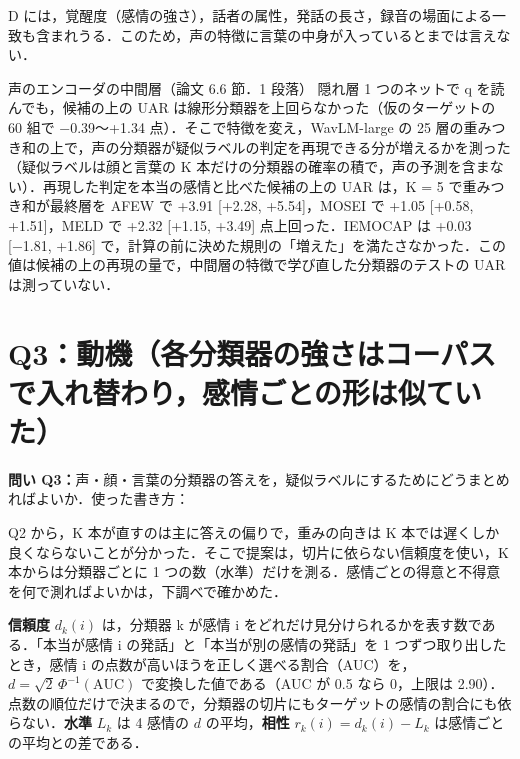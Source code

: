 \documentclass[a4paper,10pt]{ltjsarticle}
\newcommand{\toihead}[4][]{\begin{headbar}[#2]\textbf{\textcolor{#2}{問い #3：}}#4\if\relax\detokenize{#1}\relax\else\hfill{\small 使った書き方：}#1\fi\end{headbar}}
\newcommand{\pagesection}[1]{\clearpage\section{#1}}
\begin{document}
\begin{yowai}
D には，覚醒度（感情の強さ），話者の属性，発話の長さ，録音の場面による一致も含まれうる．このため，声の特徴に言葉の中身が入っているとまでは言えない．
\end{yowai}

\begin{waku}{声のエンコーダの中間層（論文 6.6 節．1 段落）}
\small
隠れ層 1 つのネットで q を読んでも，候補の上の UAR は線形分類器を上回らなかった（仮のターゲットの 60 組で −0.39〜+1.34 点）．そこで特徴を変え，WavLM-large の 25 層の重みつき和の上で，声の分類器が疑似ラベルの判定を再現できる分が増えるかを測った（疑似ラベルは顔と言葉の K 本だけの分類器の確率の積で，声の予測を含まない）．再現した判定を本当の感情と比べた候補の上の UAR は，K = 5 で重みつき和が最終層を AFEW で +3.91 [+2.28, +5.54]，MOSEI で +1.05 [+0.58, +1.51]，MELD で +2.32 [+1.15, +3.49] 点上回った．IEMOCAP は +0.03 [−1.81, +1.86] で，計算の前に決めた規則の「増えた」を満たさなかった．この値は候補の上の再現の量で，中間層の特徴で学び直した分類器のテストの UAR は測っていない．
\end{waku}

\pagesection{Q3：動機（各分類器の強さはコーパスで入れ替わり，感情ごとの形は似ていた）}\label{sec:q3mot}
\toihead{cQ3}{Q3}{声・顔・言葉の分類器の答えを，疑似ラベルにするためにどうまとめればよいか．}

\noindent Q2 から，K 本が直すのは主に答えの偏りで，重みの向きは K 本では遅くしか良くならないことが分かった．そこで提案は，切片に依らない信頼度を使い，K 本からは分類器ごとに 1 つの数（水準）だけを測る．感情ごとの得意と不得意を何で測ればよいかは，下調べで確かめた．

\noindent\textbf{信頼度} $d_k(i)$ は，分類器 k が感情 i をどれだけ見分けられるかを表す数である．「本当が感情 i の発話」と「本当が別の感情の発話」を 1 つずつ取り出したとき，感情 i の点数が高いほうを正しく選べる割合（AUC）を，$d=\sqrt2\,\Phi^{-1}(\mathrm{AUC})$ で変換した値である（AUC が 0.5 なら 0，上限は 2.90）．点数の順位だけで決まるので，分類器の切片にもターゲットの感情の割合にも依らない．\textbf{水準} $L_k$ は 4 感情の $d$ の平均，\textbf{相性} $r_k(i)=d_k(i)-L_k$ は感情ごとの平均との差である．
\end{document}
